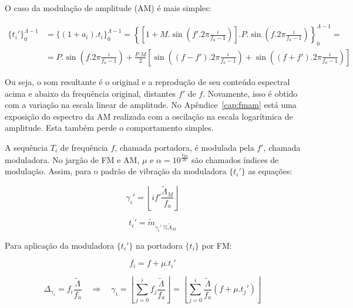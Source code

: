 O caso da modulação de amplitude (AM) é mais simples:

\begin{equation}\label{eq:am}
\begin{split}
\{t_i'\}_0^{\Lambda-1} & =\{(1+a_i) . t_i\}_0^{\Lambda-1}= \left \{ \left [ 1+M.\sin \left ( f'.2\pi\frac{i}{f_a -1} \right ) \right] . P .\sin \left ( f.2\pi\frac{i}{f_a -1} \right ) \right \}_0^{\Lambda-1} = \\
& = P.\sin \left( f.2\pi\frac{i}{f_a -1}  \right ) + \frac{P.M}{2} \left [ \sin \left( (f-f').2\pi\frac{i}{f_a -1}  \right ) + \sin \left( (f+f').2\pi\frac{i}{f_a -1}  \right ) \right ]
\end{split}
\end{equation}

Ou seja, o som resultante é o original
e a reprodução de seu conteúdo espectral acima e abaixo da frequência
original, distantes $f'$ de $f$. Novamente, isso é obtido com a variação na escala linear de amplitude. No Apêndice~\ref{cap:fmam} está uma exposição do espectro da AM realizada com a oscilação na escala logarítmica de amplitude. Esta também perde o comportamento simples.

A sequência $T_i$ de frequência $f$, chamada portadora, é modulada pela $f'$, chamada moduladora. No jargão de FM e AM, $\mu$ e $\alpha=10^{\frac{V_{dB}}{20}}$ são chamados índices de modulação. Assim, 
para o padrão de vibração da moduladora $\{t_i'\}$ as equações:

\begin{equation}\label{fmGamma}
\gamma_i'=\left \lfloor i f' \frac{\widetilde{\Lambda}_M}{f_a} \right \rfloor
\end{equation}

\begin{equation}\label{fmAux}
t_i'=\widetilde{m}_{\gamma_i' \;\% \widetilde{\Lambda}_M}
\end{equation}

Para aplicação da moduladora $\{t_i'\}$ na portadora $\{t_i\}$
por FM:

\begin{equation}\label{fmF}
f_i=f + \mu . t_i'
\end{equation}

\begin{equation}\label{fmGamma}
\Delta_{\gamma_i}=f_i\frac{\widetilde{\Lambda}}{f_a} \quad \Rightarrow \quad \gamma_i = \left \lfloor \sum_{j=0}^{i} f_j \frac{\widetilde{\Lambda}}{f_a} \right \rfloor = \left \lfloor \sum_{j=0}^{i} \frac{\widetilde{\Lambda}}{f_a}(f+\mu . t_j') \right\rfloor
\end{equation}

